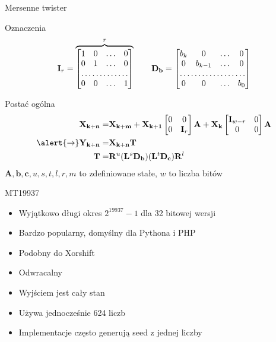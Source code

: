 \documentclass{mp}
\renewcommand{\vec}[1]{\mathbf{#1}}
\newcommand{\diag}[1]{\vec{D_{#1}}}
\begin{document}
\begin{frame}{Mersenne twister}
\begin{block}{Oznaczenia}
\[ \vec{I}_r =  \overbrace{\begin{bmatrix} 
1 & 0 & \ldots & 0 \\
0 & 1 & \ldots & 0 \\
\hdotsfor{4} \\
0 & 0 & \ldots & 1 \\
\end{bmatrix}}^{r} 
\qquad
\diag{b} = \begin{bmatrix}
b_k & 0 & \ldots & 0 \\
0 & b_{k-1} & \ldots & 0 \\
\hdotsfor{4} \\
0 & 0 & \ldots & b_0
\end{bmatrix}
\]
\end{block}
\pause
\begin{block}{Postać ogólna}
\begin{align*}
\vec{X_{k+n}} = & \vec{X_{k+m}} + \vec{X_{k+1}}\begin{bmatrix} 0 & 0 \\ 0 & \vec{I}_r \end{bmatrix}\vec{A} + \vec{X_k}\begin{bmatrix} \vec{I}_{w-r} & 0 \\ 0 & 0 \end{bmatrix}\vec{A} \\
\alert{\rightarrow} \vec{Y_{k+n}} = & \vec{X_{k+n}}\vec{T} \\
\vec{T} = & \vec{R}^u(\vec{L}^s\diag{b})(\vec{L}^t\diag{c})\vec{R}^l
\end{align*}
$\vec{A}, \vec{b}, \vec{c}, u, s, t, l, r, m$ to zdefiniowane stałe, $w$ to liczba bitów
\end{block}
\pause
{}
\end{frame}
\begin{frame}{MT19937}
\begin{itemize}
\item Wyjątkowo długi okres $2^{19937}-1$ dla 32 bitowej wersji
\pause
\item Bardzo popularny, domyślny dla Pythona i PHP
\pause
\item Podobny do Xorshift
\pause
\item Odwracalny
\pause
\item Wyjściem jest cały stan
\pause
\item Używa jednocześnie 624 liczb
\pause
\item Implementacje często generują seed z jednej liczby
\end{itemize}
\end{frame}
\end{document}
